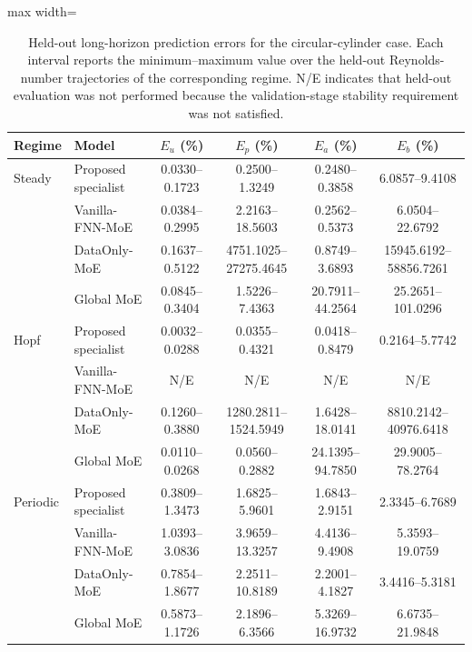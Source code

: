 
\begin{table}[htbp]
\centering
\caption{Held-out long-horizon prediction errors for the circular-cylinder
case. Each interval reports the minimum--maximum value over the held-out
Reynolds-number trajectories of the corresponding regime. N/E indicates that
held-out evaluation was not performed because the validation-stage stability
requirement was not satisfied.}
\label{tab:cylinder_specialist_long}

\scriptsize
\setlength{\tabcolsep}{5.0pt}
\begin{adjustbox}{max width=\textwidth}
\begin{tabular}{@{}llcccc@{}}
\toprule
Regime
& Model
& $E_u$ (\%)
& $E_p$ (\%)
& $E_a$ (\%)
& $E_b$ (\%) \\
\midrule

Steady
& Proposed specialist
& 0.0330--0.1723
& 0.2500--1.3249
& 0.2480--0.3858
& 6.0857--9.4108 \\

& Vanilla-FNN-MoE
& 0.0384--0.2995
& 2.2163--18.5603
& 0.2562--0.5373
& 6.0504--22.6792 \\

& DataOnly-MoE
& 0.1637--0.5122
& 4751.1025--27275.4645
& 0.8749--3.6893
& 15945.6192--58856.7261 \\

& Global MoE
& 0.0845--0.3404
& 1.5226--7.4363
& 20.7911--44.2564
& 25.2651--101.0296 \\

\midrule

Hopf
& Proposed specialist
& 0.0032--0.0288
& 0.0355--0.4321
& 0.0418--0.8479
& 0.2164--5.7742 \\

& Vanilla-FNN-MoE
& N/E
& N/E
& N/E
& N/E \\

& DataOnly-MoE
& 0.1260--0.3880
& 1280.2811--1524.5949
& 1.6428--18.0141
& 8810.2142--40976.6418 \\

& Global MoE
& 0.0110--0.0268
& 0.0560--0.2882
& 24.1395--94.7850
& 29.9005--78.2764 \\

\midrule

Periodic
& Proposed specialist
& 0.3809--1.3473
& 1.6825--5.9601
& 1.6843--2.9151
& 2.3345--6.7689 \\

& Vanilla-FNN-MoE
& 1.0393--3.0836
& 3.9659--13.3257
& 4.4136--9.4908
& 5.3593--19.0759 \\

& DataOnly-MoE
& 0.7854--1.8677
& 2.2511--10.8189
& 2.2001--4.1827
& 3.4416--5.3181 \\

& Global MoE
& 0.5873--1.1726
& 2.1896--6.3566
& 5.3269--16.9732
& 6.6735--21.9848 \\

\bottomrule
\end{tabular}
\end{adjustbox}
\end{table}

